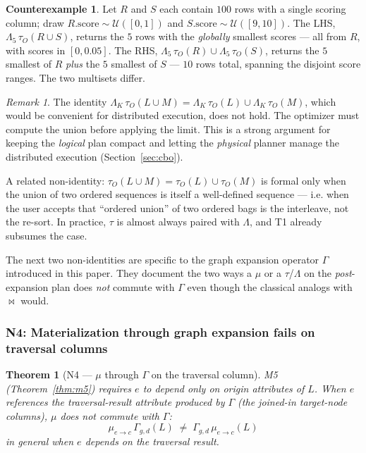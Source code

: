 \documentclass[sigconf,nonacm,review]{acmart}
\theoremstyle{plain}
\newtheorem{theorem}{Theorem}
\theoremstyle{definition}
\newtheorem{counterexample}{Counterexample}
\theoremstyle{remark}
\newtheorem{remark}{Remark}
\begin{document}
\begin{counterexample}\label{ce:n3}
Let $R$ and $S$ each contain $100$ rows with a single scoring
column; draw $R.\mathrm{score} \sim \mathcal{U}([0,1])$ and
$S.\mathrm{score} \sim \mathcal{U}([9,10])$. The LHS,
$\Lambda_5\, \tau_O(R \cup S)$, returns the $5$ rows with the
\emph{globally} smallest scores --- all from $R$, with scores
in $[0, 0.05]$. The RHS, $\Lambda_5\, \tau_O(R) \cup \Lambda_5\,
\tau_O(S)$, returns the $5$ smallest of $R$ \emph{plus} the $5$
smallest of $S$ --- $10$ rows total, spanning the disjoint score
ranges. The two multisets differ.
\end{counterexample}

\begin{remark}
The identity $\Lambda_K\, \tau_O(L \cup M) = \Lambda_K\, \tau_O(L)
\cup \Lambda_K\, \tau_O(M)$, which would be convenient for
distributed execution, does not hold. The optimizer must compute
the union before applying the limit. This is a strong argument for
keeping the \emph{logical} plan compact and letting the
\emph{physical} planner manage the distributed execution
(Section~\ref{sec:cbo}).
\end{remark}

A related non-identity: $\tau_O(L \cup M) = \tau_O(L) \cup \tau_O(M)$
is formal only when the union of two ordered sequences is itself a
well-defined sequence --- i.e. when the user accepts that ``ordered
union'' of two ordered bags is the interleave, not the re-sort. In
practice, $\tau$ is almost always paired with $\Lambda$, and T1
already subsumes the case.

The next two non-identities are specific to the graph expansion
operator $\Gamma$ introduced in this paper. They document
the two ways a $\mu$ or a $\tau$/$\Lambda$ on the \emph{post}-expansion
plan does \emph{not} commute with $\Gamma$ even though the
classical analogs with $\bowtie$ would.

\subsubsection{N4: Materialization through graph expansion fails on traversal columns}

\begin{theorem}[N4 --- $\mu$ through $\Gamma$ on the traversal column]\label{thm:n4}
M5 (Theorem~\ref{thm:m5}) requires $e$ to depend only on
\emph{origin} attributes of $L$. When $e$ references the
traversal-result attribute produced by $\Gamma$ (the joined-in
target-node columns), $\mu$ does \emph{not} commute with
$\Gamma$:
\[
\mu_{e \to c}\, \Gamma_{g, d}(L) \;\neq\;
\Gamma_{g, d}\, \mu_{e \to c}(L)
\]
in general when $e$ depends on the traversal result.
\end{theorem}
\end{document}
